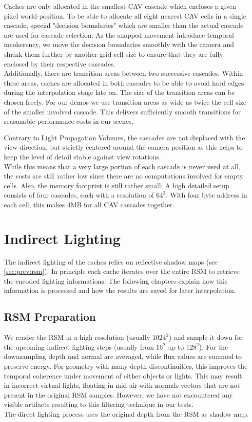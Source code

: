 \documentclass[thesis.tex]{subfiles}
\begin{document}
Caches are only allocated in the smallest CAV cascade which encloses a given pixel world-position.
To be able to allocate all eight nearest CAV cells in a single cascade, special "decision boundaries" which are smaller than the actual cascade are used for cascade selection.
As the snapped movement introduce temporal incoherency, we move the decision boundaries smoothly with the camera and shrink them further by another grid cell size to ensure that they are fully enclosed by their respective cascades.
\\
Additionally, there are transition areas between two successive cascades.
Within these areas, caches are allocated in both cascades to be able to avoid hard edges during the interpolation stage late on.
The size of the transition areas can be chosen freely.
For our demos we use transition areas as wide as twice the cell size of the smaller involved cascade.
This delivers sufficiently smooth transitions for reasonable performance costs in our scenes.

Contrary to Light Propagation Volumes, the cascades are not displaced with the view direction, but strictly centered around the camera position as this helps to keep the level of detail stable against view rotations.\\
While this means that a very large portion of each cascade is never used at all, the costs are still rather low since there are no computations involved for empty cells.
Also, the memory footprint is still rather small: %
A high detailed setup consists of four cascades, each with a resolution of $64^3$.
With four byte address in each cell, this makes 4MB for all CAV cascades together.

\section{Indirect Lighting}
The indirect lighting of the caches relies on reflective shadow maps (see \autoref{sec:prev:rsm}).
In principle each cache iterates over the entire RSM to retrieve the encoded lighting informations.
The following chapters explain how this information is processed and how the results are saved for later interpolation.

\subsection{RSM Preparation}
We render the RSM in a high resolution (usually $1024^2$) and sample it down for the upcoming indirect lighting steps (usually from $16^2$ up to $128^2$).
For the downsampling depth and normal are averaged, while flux values are summed to preserve energy.
For geometry with many depth discontinuities, this improves the temporal coherence under movement of either objects or lights.
This may result in incorrect virtual lights, floating in mid air with normals vectors that are not present in the original RSM samples.
However, we have not encountered any visible artifacts resulting to this filtering technique in our tests.
\\
The direct lighting process uses the original depth from the RSM as shadow map.
\end{document}

